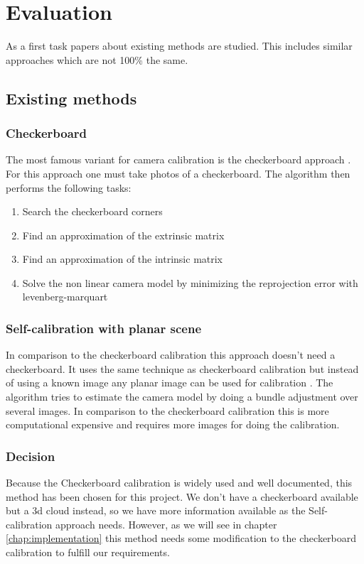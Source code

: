 \documentclass[11pt,a4paper,titlepage,oneside]{report}
\begin{document}
\chapter{Evaluation}

As a first task papers about existing methods are studied. This includes similar approaches which are not 100\% the same.

\section{Existing methods}
\subsection{Checkerboard}\label{sec:checkerboard}
The most famous variant for camera calibration is the checkerboard approach \cite{zhang}. For this approach one must take photos of a checkerboard. The algorithm then performs the following tasks:
\begin{enumerate}
  \item Search the checkerboard corners
  \item Find an approximation of the extrinsic matrix
  \item Find an approximation of the intrinsic matrix
  \item Solve the non linear camera model by minimizing the reprojection error with levenberg-marquart
\end{enumerate}

\subsection{Self-calibration with planar scene}
In comparison to the checkerboard calibration this approach doesn't need a checkerboard. It uses the same technique as checkerboard calibration but instead of using a known image any planar image can be used for calibration \cite{selfcalib}. The algorithm tries to estimate the camera model by doing a bundle adjustment over several images. In comparison to the checkerboard calibration this is more computational expensive and requires more images for doing the calibration.

\subsection{Decision}
Because the Checkerboard calibration is widely used and well documented, this method has been chosen for this project. We don't have a checkerboard available but a 3d cloud instead, so we have more information available as the Self-calibration approach needs. However, as we will see in chapter \ref{chap:implementation} this method needs some modification to the checkerboard calibration to fulfill our requirements.
\end{document}
